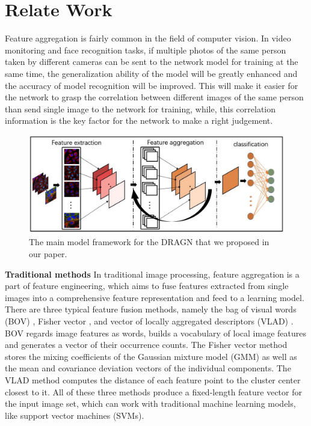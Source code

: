 \documentclass[10pt,twocolumn,letterpaper]{article}
\begin{document}
\section{Relate Work}
Feature aggregation is fairly common in the field of computer vision. In video monitoring and face recognition tasks, if multiple photos of the same person taken by different cameras can be sent to the network model for training at the same time, the generalization ability of the model will be greatly enhanced and the accuracy of model recognition will be improved. This will make it easier for the network to grasp the correlation between different images of the same person than send single image to the network for training, while, this correlation information is the key factor for the network to make a right judgement.

\begin{figure}
\begin{center}
\includegraphics[width=0.8\linewidth]{framework.JPG}
\end{center}
   \caption{The main model framework for the DRAGN that we proposed in our paper.}
\label{fig:short}
\end{figure}

\textbf{Traditional methods} 
In traditional image processing, feature aggregation is a part of feature engineering, which aims to fuse features extracted from single images into a comprehensive feature representation and feed to a learning model. There are three typical feature fusion methods, namely the bag of visual words (BOV) \cite{bov}, Fisher vector \cite{fishervector}, and vector of locally aggregated descriptors (VLAD) \cite{vlad}. BOV regards image features as words, builds a vocabulary of local image features and generates a vector of their occurrence counts. The Fisher vector method stores the mixing coefficients of the Gaussian mixture model (GMM) as well as the mean and covariance deviation vectors of the individual components. The VLAD method computes the distance of each feature point to the cluster center closest to it. All of these three methods produce a fixed-length feature vector for the input image set, which can work with traditional machine learning models, like support vector machines (SVMs).
\end{document}
